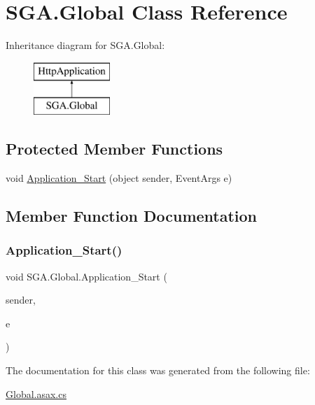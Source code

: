 \hypertarget{class_s_g_a_1_1_global}{}\section{S\+G\+A.\+Global Class Reference}
\label{class_s_g_a_1_1_global}
Inheritance diagram for S\+G\+A.\+Global\+:\begin{figure}[H]
\begin{center}
\leavevmode
\includegraphics[height=2.000000cm]{class_s_g_a_1_1_global}
\end{center}
\end{figure}
\subsection*{Protected Member Functions}
\begin{DoxyCompactItemize}
\item 
void \hyperlink{class_s_g_a_1_1_global_a91c216f957f9c57c1e11c84c63bbfe4b}{Application\+\_\+\+Start} (object sender, Event\+Args e)
\end{DoxyCompactItemize}


\subsection{Member Function Documentation}
\mbox{\label{class_s_g_a_1_1_global_a91c216f957f9c57c1e11c84c63bbfe4b}} 
\subsubsection{\texorpdfstring{Application\+\_\+\+Start()}{Application\_Start()}}
{\footnotesize\ttfamily void S\+G\+A.\+Global.\+Application\+\_\+\+Start (\begin{DoxyParamCaption}\item[{object}]{sender,  }\item[{Event\+Args}]{e }\end{DoxyParamCaption})\hspace{0.3cm}{\ttfamily [protected]}}



The documentation for this class was generated from the following file\+:\begin{DoxyCompactItemize}
\item 
\hyperlink{_global_8asax_8cs}{Global.\+asax.\+cs}\end{DoxyCompactItemize}
